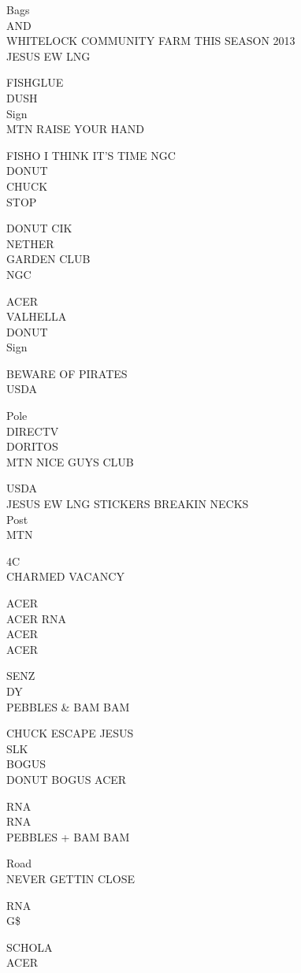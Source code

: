 \documentclass[10pt,letterpaper]{article}
\begin{document}
Bags\\
AND\\
WHITELOCK COMMUNITY FARM THIS SEASON 2013\\
JESUS EW LNG

FISHGLUE\\
DUSH\\
Sign\\
MTN RAISE YOUR HAND

FISHO I THINK IT'S TIME NGC\\
DONUT\\
CHUCK\\
STOP

DONUT CIK\\
NETHER\\
GARDEN CLUB\\
NGC

ACER\\
VALHELLA\\
DONUT\\
Sign

BEWARE OF PIRATES\\
USDA

Pole\\
DIRECTV\\
DORITOS\\
MTN NICE GUYS CLUB

USDA\\
JESUS EW LNG STICKERS BREAKIN NECKS\\
Post\\
MTN

4C\\
CHARMED VACANCY

ACER\\
ACER RNA\\
ACER\\
ACER

SENZ\\
DY\\
PEBBLES \& BAM BAM

CHUCK ESCAPE JESUS\\
SLK\\
BOGUS\\
DONUT BOGUS ACER

RNA\\
RNA\\
PEBBLES + BAM BAM

Road\\
NEVER GETTIN CLOSE

RNA\\
G\$

SCHOLA\\
ACER
\end{document}
